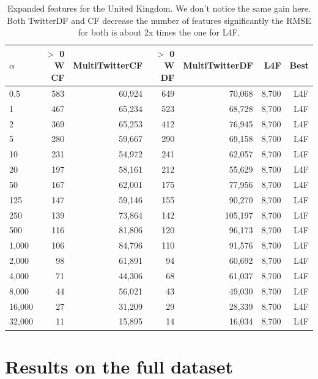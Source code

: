 \documentclass[minf,frontabs,twoside,singlespacing,parskip]{infthesis}
\begin{document}
\begin{table}[]
\begin{center}
\begin{tabular}{ l | r | r | r | r | r | r}
$\alpha$ & $>$ 0 W CF & MultiTwitterCF & $>$ 0 W DF & MultiTwitterDF & L4F & Best\\
\hline
0.5 & 583 & 60,924 & 649 & 70,068 & 8,700 & L4F\\
1 & 467 & 65,234 & 523 & 68,728 & 8,700 & L4F\\
2 & 369 & 65,253 & 412 & 76,945 & 8,700 & L4F\\
5 & 280 & 59,667 & 290 & 69,158 & 8,700 & L4F\\
10 & 231 & 54,972 & 241 & 62,057 & 8,700 & L4F\\
20 & 197 & 58,161 & 212 & 55,629 & 8,700 & L4F\\
50 & 167 & 62,001 & 175 & 77,956 & 8,700 & L4F\\
125 & 147 & 59,146 & 155 & 90,270 & 8,700 & L4F\\
250 & 139 & 73,864 & 142 & 105,197 & 8,700 & L4F\\
500 & 116 & 81,806 & 120 & 96,173 & 8,700 & L4F\\
1,000 & 106 & 84,796 & 110 & 91,576 & 8,700 & L4F\\
2,000 & 98 & 61,891 & 94 & 60,692 & 8,700 & L4F\\
4,000 & 71 & 44,306 & 68 & 61,037 & 8,700 & L4F\\
8,000 & 44 & 56,021 & 43 & 49,030 & 8,700 & L4F\\
16,000 & 27 & 31,209 & 29 & 28,339 & 8,700 & L4F\\
32,000 & 11 & 15,895 & 14 & 16,034 & 8,700 & L4F\\
\end{tabular}
\end{center}
\caption{Expanded features for the United Kingdom. We don't notice the same gain here. Both TwitterDF and CF decrease the number of features significantly the RMSE for both is about 2x times the one for L4F.}
\label{uk}
\end{table}

\newpage
\section{Results on the full dataset}

\end{document}

